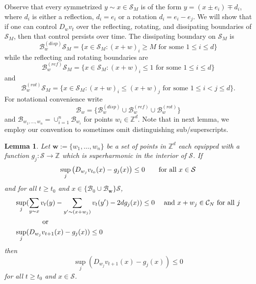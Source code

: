 \documentclass[12pt]{amsart}
\newtheorem{lemma}[theorem]{Lemma}
\newcommand{\Z}{\mathbb{Z}}
\begin{document}
	
	Observe that every symmetrized $y \sim x \in \mathcal{S}_M$ is of the form $y = (x \pm e_i) \mp d_i$,  where $d_i$ is either a reflection, $d_i = e_i$ or a 
	rotation $d_i = e_i -e_j$. We will show that if one can control $D_{w} v_t$ over the reflecting, rotating, and dissipating boundaries of $\mathcal{S}_M$, then that control persists over time. The dissipating boundary on $\mathcal{S}_M$ is
	\begin{equation} \label{eq:dissipative_boundary}
	\mathcal{B}^{(disp)}_w \mathcal{S}_M = \{ x \in \mathcal{S}_M : (x + w)_{i} \geq M  \mbox{ for some $1 \leq i \leq d$} \}
	\end{equation}
	while the reflecting and rotating boundaries are  
	\begin{equation} \label{eq:reflecting_boundary}
	\mathcal{B}^{(ref)}_w \mathcal{S}_M = \{ x \in \mathcal{S}_M : (x+w)_{i} \leq 1 \mbox{ for some $1 \leq i \leq d$} \}
	\end{equation}
	and
	\begin{equation} \label{eq:rotating_boundary}
	\mathcal{B}^{(rot)}_w \mathcal{S}_M = \{ x \in \mathcal{S}_M : (x+w)_i \leq (x + w)_j \mbox{ for some $1 \leq i < j \leq d$} \}.
	\end{equation}
	For notational convenience write
	\begin{equation} \label{eq:all_boundaries}
	\mathcal{B}_w = \{\mathcal{B}^{(disp)}_{w}  \cup \mathcal{B}^{(ref)}_{w} \cup \mathcal{B}^{(rot)}_{w} \}
	\end{equation}
	and  $\mathcal{B}_{w_1, \ldots, w_n} = \cup_{i=1}^n \mathcal{B}_{w_i}$
	for points $w_i \in \Z^d$. 
		Note that in next lemma, we employ our convention to sometimes omit distinguishing sub/superscripts. 
	
	\begin{lemma} \label{general_difference_comparison}
		Let  $\mathbf{w} := \{w_1, \ldots, w_n\}$ be a set of points in $\Z^d$ each equipped with a function $g_j: \mathcal{S} \to \Z$ which is superharmonic in the interior of $\mathcal{S}$. If	
		\begin{equation}
		\label{eq:initial_cond} \sup_{j} \left( D_{w_j} v_{t_0}(x) - g_j(x) \right)  \leq 0 \mbox{\qquad for all $x \in \mathcal{S}$}
		\end{equation}
		and for all $t \geq t_0$ and $x \in \{\mathcal{B}_0 \cup \mathcal{B}_{\mathbf{w}}\} \mathcal{S}$,
		\begin{equation} \label{eq:boundaries_ref}
		\begin{aligned}
		\sup_{j} &( \sum_{y \sim x} v_{t}(y) - \sum_{y' \sim (x + w_j)} v_{t}(y') -  2 d g_j(x) ) \leq 0 \mbox{ \quad and $x + w_j \in \mathcal{C}_N$ for all $j$} \\
		&\mbox{  \qquad or } \\
		\sup_{j}  &( D_{w_j} v_{t+1}(x) - g_j(x) ) \leq 0
		 \end{aligned}
		\end{equation}
		then
		\begin{equation} \label{eq:derivative_comparison}
		\sup_{j} \left( D_{w_j} v_{t+1}(x) - g_j(x) \right) \leq 0
		\end{equation}
		for all $t \geq t_0$ and $x \in \mathcal{S}$. 
		
	\end{lemma}
	
\end{document}
